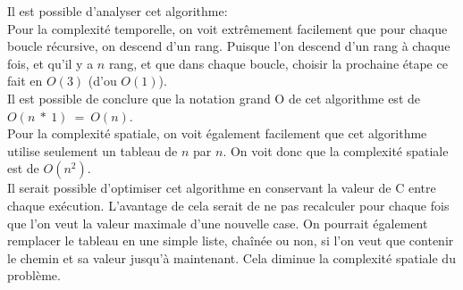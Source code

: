 \documentclass[devoir3.tex]{subfiles}
\begin{document}
Il est possible d'analyser cet algorithme:\\

Pour la complexité temporelle, on voit extrêmement facilement que pour chaque boucle récursive, on descend d'un rang. Puisque l'on descend d'un rang à chaque fois, et qu'il y a \( n \) rang, et que dans chaque boucle, choisir la prochaine étape ce fait en \( O(3) \) (d'ou \( O(1) \)).\\

Il est possible de conclure que la notation grand O de cet algorithme est de \( O(n \: * \: 1) \: = \: O(n) \).\\

Pour la complexité spatiale, on voit également facilement que cet algorithme utilise seulement un tableau de \(n\) par \(n\). On voit donc que la complexité spatiale est de \(O(n^2)\).\\

Il serait possible d'optimiser cet algorithme en conservant la valeur de C entre chaque exécution. L'avantage de cela serait de ne pas recalculer pour chaque fois que l'on veut la valeur maximale d'une nouvelle case. On pourrait également remplacer le tableau en une simple liste, chaînée ou non, si l'on veut que contenir le chemin et sa valeur jusqu'à maintenant. Cela diminue la complexité spatiale du problème.
\end{document}
